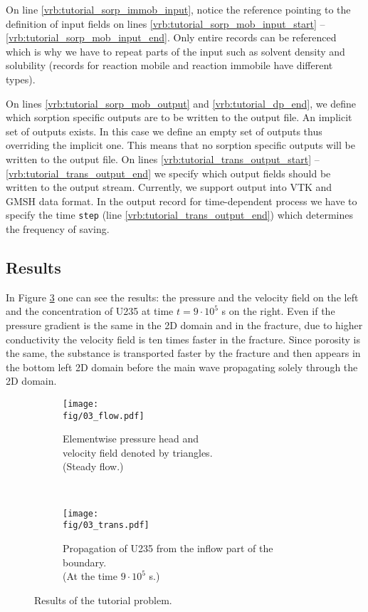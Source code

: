 On line \ref{vrb:tutorial_sorp_immob_input}, notice the reference pointing to the definition of input fields on lines \ref{vrb:tutorial_sorp_mob_input_start} -- \ref{vrb:tutorial_sorp_mob_input_end}. Only entire records 
can be referenced which is why we have to repeat parts of the input such as solvent density and solubility 
(records for reaction mobile and reaction immobile have different types).

On lines \ref{vrb:tutorial_sorp_mob_output} and \ref{vrb:tutorial_dp_end}, we define which sorption specific outputs are to be written to the output file. 
An implicit set of outputs exists. In this case we define an empty set of outputs thus overriding the implicit one. 
This means that no sorption specific outputs will be written to the output file.
On lines \ref{vrb:tutorial_trans_output_start} -- \ref{vrb:tutorial_trans_output_end} we specify which output fields should be written to the output stream. Currently, we support output into VTK and GMSH data format.
In the output record for time-dependent process we have to specify the time {\tt step} (line \ref{vrb:tutorial_trans_output_end}) which determines the frequency of saving.



\subsection{Results}
In Figure \ref{fig:tutorial} one can see the results: the pressure and the velocity field on the left and the 
concentration of U235 at time $t=9\cdot10^{5}$ s on the right. Even if the pressure gradient is the same in the 
2D domain and in the fracture, due to higher conductivity the velocity field is ten times faster in the fracture. 
Since porosity is the same, the substance is transported faster by the fracture and then appears in the bottom 
left 2D domain before the main wave propagating solely through the 2D domain.



\begin{figure}[ht]
    \centering
    \begin{subfigure}[b]{0.48\textwidth}
        \centering
        \texttt{[image: \\fig/03\_flow.pdf]}
        \caption{Elementwise pressure head and\\velocity field denoted by triangles.\\ (Steady flow.)}
        \label{fig:tut-flow}
    \end{subfigure}
    ~
    \begin{subfigure}[b]{0.48\textwidth}
        \centering
        \texttt{[image: \\fig/03\_trans.pdf]}
        \caption{Propagation of U235 from the inflow part of the boundary. \\ (At the time $9\cdot10^{5}$ s.)}
        \label{fig:tut-trans}
    \end{subfigure}
    \caption{Results of the tutorial problem.}
    \label{fig:tutorial}
\end{figure}
